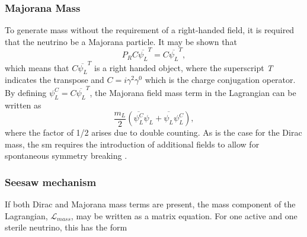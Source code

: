 \subsubsection{Majorana Mass}
To generate mass without the requirement of a right-handed field, it is required that the neutrino be a Majorana particle. It may be shown that 
\begin{equation}
    P_R C\overline{\psi_L}^T = C\overline{\psi_L}^T,
\end{equation}
which means that $C\overline{\psi_L}^T$ is a right handed object, where the superscript \textit{T} indicates the transpose and $C = i \gamma^2 \gamma^0$ which is the charge conjugation operator. By defining $\psi_L^C = C\overline{\psi_L}^T$, the Majorana field mass term in the Lagrangian can be written as
\begin{equation}\label{eqn:Majorana mass term}
    \frac{m_L}{2}(\overline{\psi_L^C}\psi_L + \overline{\psi_L^{\phantom{C}}}\psi_L^C), 
\end{equation}
where the factor of 1/2 arises due to double counting. As is the case for the Dirac mass, the \gls{sm} requires the introduction of additional fields to allow for spontaneous symmetry breaking \cite{Fundamentals_of_Neutrino_Physics_and_Astrophysics}. 

\subsubsection{Seesaw mechanism}\label{sec:seesaw_mechanism}
If both Dirac and Majorana mass terms are present, the mass component of the Lagrangian, $\mathcal{L}_{mass}$, may be written as a matrix equation. For one active and one sterile neutrino, this has the form

